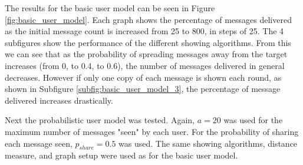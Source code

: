 \documentclass[bsc,frontabs,twoside,singlespacing,parskip,deptreport]{infthesis}     %
\begin{document}
The results for the basic user model can be seen in Figure \ref{fig:basic_user_model}. Each graph shows the percentage of messages delivered as the initial message count is increased from 25 to 800, in steps of 25. The 4 subfigures show the performance of the different showing algorithms. From this we can see that as the probability of spreading messages away from the target increases (from 0, to 0.4, to 0.6), the number of messages delivered in general decreases. However if only one copy of each message is shown each round, as shown in  Subfigure \ref{subfig:basic_user_model_3}, the percentage of message delivered increases drastically.

Next the probabilistic user model was tested. Again, $a=20$ was used for the maximum number of messages "seen" by each user. For the probability of sharing each message seen, $p_{share}=0.5$ was used. The same showing algorithms, distance measure, and graph setup were used as for the basic user model.
\end{document}

